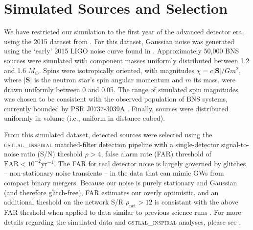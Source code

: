 \section{Simulated Sources and Selection}

We have restricted our simulation to the first year of the advanced detector era, using the 2015 dataset from \citet{Singer_2014}.  For this dataset, Gaussian noise was generated using the `early' 2015 LIGO noise curve found in \cite{Barsotti:2012}.  Approximately 50,000 BNS sources were simulated with component masses uniformly distributed between 1.2 and 1.6 $M_\odot$.  Spins were isotropically oriented, with magnitudes $\chi = c |\mathbf{S}|/G m^2$, where $|\mathbf{S}|$ is the neutron star's spin angular momentum and $m$ its mass, were drawn uniformly between 0 and 0.05.  The range of simulated spin magnitudes was chosen to be consistent with the observed population of BNS systems, currently bounded by PSR J0737-3039A \cite{Burgay_2003,Brown_2012}.  Finally, sources were distributed uniformly in volume (i.e., uniform in distance cubed).

From this simulated dataset, detected sources were selected using the \textsc{gstlal\_inspiral} matched-filter detection pipeline \cite{Cannon_2012} with a single-detector signal-to-noise ratio (S/N) theshold $\rho>4$, false alarm rate (FAR) threshold of $\mathrm{FAR}<10^{-2}\mathrm{yr}^{-1}$.  The FAR for real detector noise is largely governed by glitches -- non-stationary noise transients -- in the data that can mimic GWs from compact binary mergers.  Because our noise is purely stationary and Gaussian (and therefore glitch-free), FAR estimates our overly optimistic, and an additional theshold on the network S/R $\rho_\mathrm{net} > 12$ is consistant with the above FAR theshold when applied to data similar to previous science runs \cite{2013arXiv1304.0670L}.  For more details regarding the simulated data and \textsc{gstlal\_inspiral} analyses, please see \citet{2013arXiv1304.0670L}.